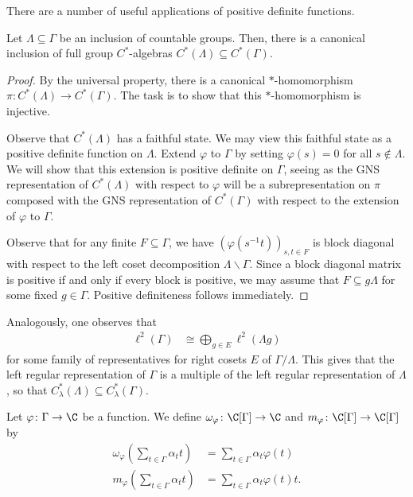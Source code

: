 \documentclass[10pt]{mypackage}
\begin{document}
There are a number of useful applications of positive definite functions.
\begin{proposition}
  Let $\Lambda\subseteq \Gamma$ be an inclusion of countable groups. Then, there is a canonical inclusion of full group $C^{\ast}$-algebras $C^{\ast}\left( \Lambda \right)\subseteq C^{\ast}\left( \Gamma \right)$. 
\end{proposition}
\begin{proof}
  By the universal property, there is a canonical $\ast$-homomorphism $\pi\colon C^{\ast}\left( \Lambda \right)\to C^{\ast}\left( \Gamma \right)$. The task is to show that this $\ast$-homomorphism is injective.

  Observe that $C^{\ast}\left( \Lambda \right)$ has a faithful state. We may view this faithful state as a positive definite function on $\Lambda$. Extend $\varphi$ to $\Gamma$ by setting $\varphi(s) = 0$ for all $s\notin \Lambda$. We will show that this extension is positive definite on $\Gamma$, seeing as the GNS representation of $C^{\ast}\left( \Lambda \right)$ with respect to $\varphi$ will be a subrepresentation on $\pi$ composed with the GNS representation of $C^{\ast}\left( \Gamma \right)$ with respect to the extension of $\varphi$ to $\Gamma$.

  Observe that for any finite $F\subseteq \Gamma$, we have $\left( \varphi\left( s^{-1}t \right) \right)_{s,t\in F}$ is block diagonal with respect to the left coset decomposition $\Lambda\backslash\Gamma$. Since a block diagonal matrix is positive if and only if every block is positive, we may assume that $F\subseteq g\Lambda$ for some fixed $g\in \Gamma$. Positive definiteness follows immediately.
\end{proof}
Analogously, one observes that
\begin{align*}
  \ell^2\left( \Gamma \right) &\cong \bigoplus_{g\in E} \ell^2\left( \Lambda g \right)
\end{align*}
for some family of representatives for right cosets $E$ of $\Gamma/\Lambda$. This gives that the left regular representation of $\Gamma$ is a multiple of the left regular representation of $\Lambda$, so that $C^{\ast}_{\lambda}\left( \Lambda \right)\subseteq C^{\ast}_{\lambda}\left( \Gamma \right)$.
\begin{definition}
  Let $\varphi\colon \Gamma\to \C$ be a function. We define $\omega_{\varphi}\colon \C[\Gamma]\to \C$ and $m_{\varphi}\colon \C[\Gamma]\to\C[\Gamma]$ by
  \begin{align*}
    \omega_{\varphi}\left( \sum_{t\in \Gamma}\alpha_t t \right) &= \sum_{t\in \Gamma}\alpha_t\varphi(t)\\
    m_{\varphi}\left( \sum_{t\in \Gamma}\alpha_t t \right) &= \sum_{t\in \Gamma}\alpha_t\varphi(t) t.
  \end{align*}
\end{definition}
\end{document}
